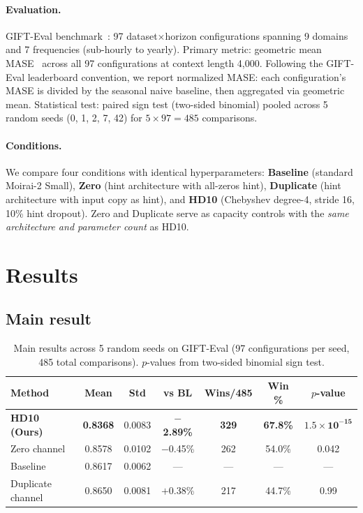 \documentclass{article}
\begin{document}
\paragraph{Evaluation.} GIFT-Eval benchmark~\citep{vijay2024gifteval}: 97 dataset$\times$horizon configurations spanning 9 domains and 7 frequencies (sub-hourly to yearly). Primary metric: geometric mean MASE~\citep{hyndman2006another} across all 97 configurations at context length 4,000. Following the GIFT-Eval leaderboard convention, we report normalized MASE: each configuration's MASE is divided by the seasonal naive baseline, then aggregated via geometric mean. Statistical test: paired sign test (two-sided binomial) pooled across 5 random seeds (0, 1, 2, 7, 42) for $5 \times 97 = 485$ comparisons.

\paragraph{Conditions.} We compare four conditions with identical hyperparameters: \textbf{Baseline} (standard Moirai-2 Small), \textbf{Zero} (hint architecture with all-zeros hint), \textbf{Duplicate} (hint architecture with input copy as hint), and \textbf{HD10} (Chebyshev degree-4, stride 16, 10\% hint dropout). Zero and Duplicate serve as capacity controls with the \emph{same architecture and parameter count} as HD10.

\section{Results}

\subsection{Main result}

\begin{table}[t]
\centering
\caption{Main results across 5 random seeds on GIFT-Eval (97 configurations per seed, 485 total comparisons). $p$-values from two-sided binomial sign test.}
\label{tab:main}
\small
\begin{tabular}{lcccccc}
\toprule
\textbf{Method} & \textbf{Mean} & \textbf{Std} & \textbf{vs BL} & \textbf{Wins/485} & \textbf{Win \%} & \textbf{$p$-value} \\
\midrule
\textbf{HD10 (Ours)} & \textbf{0.8368} & 0.0083 & \textbf{$-$2.89\%} & \textbf{329} & \textbf{67.8\%} & $\mathbf{1.5 \times 10^{-15}}$ \\
Zero channel & 0.8578 & 0.0102 & $-$0.45\% & 262 & 54.0\% & 0.042 \\
Baseline & 0.8617 & 0.0062 & --- & --- & --- & --- \\
Duplicate channel & 0.8650 & 0.0081 & $+$0.38\% & 217 & 44.7\% & 0.99 \\
\bottomrule
\end{tabular}
\end{table}
\end{document}
